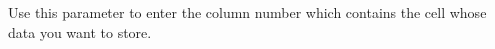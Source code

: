 
Use this parameter to enter the column number which contains the cell whose data you want to store.


